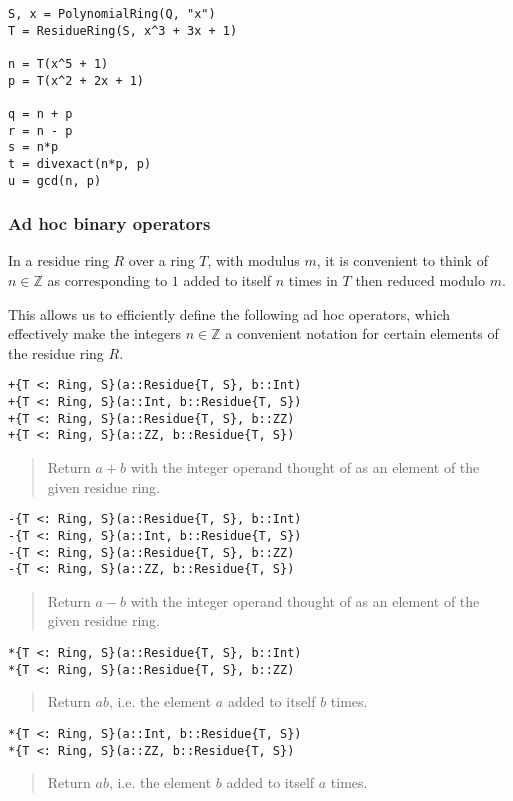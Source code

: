 \documentclass[a4paper,10pt]{article}
\newcommand{\Z}{\mathbb{Z}}
\newcommand{\desc}[1]{\vspace{-3mm}\begin{quote}#1\end{quote}}
\begin{document}
{{\begin{lstlisting}
S, x = PolynomialRing(Q, "x")
T = ResidueRing(S, x^3 + 3x + 1)

n = T(x^5 + 1)
p = T(x^2 + 2x + 1)

q = n + p
r = n - p
s = n*p
t = divexact(n*p, p)
u = gcd(n, p)
\end{lstlisting}

\subsubsection{Ad hoc binary operators}

In a residue ring $R$ over a ring $T$, with modulus $m$, it is convenient
to think of $n \in \Z$ as corresponding to $1$ added to itself $n$ times
in $T$ then reduced modulo $m$.

This allows us to efficiently define the following ad hoc operators, which
effectively make the integers $n \in \Z$ a convenient notation for certain
elements of the residue ring $R$.

\begin{lstlisting}
+{T <: Ring, S}(a::Residue{T, S}, b::Int)
+{T <: Ring, S}(a::Int, b::Residue{T, S})
+{T <: Ring, S}(a::Residue{T, S}, b::ZZ)
+{T <: Ring, S}(a::ZZ, b::Residue{T, S})
\end{lstlisting}

\desc{Return $a + b$ with the integer operand thought of as an element of 
the given residue ring.}

\begin{lstlisting}
-{T <: Ring, S}(a::Residue{T, S}, b::Int)
-{T <: Ring, S}(a::Int, b::Residue{T, S})
-{T <: Ring, S}(a::Residue{T, S}, b::ZZ)
-{T <: Ring, S}(a::ZZ, b::Residue{T, S})
\end{lstlisting}

\desc{Return $a - b$ with the integer operand thought of as an element of 
the given residue ring.}

\begin{lstlisting}
*{T <: Ring, S}(a::Residue{T, S}, b::Int)
*{T <: Ring, S}(a::Residue{T, S}, b::ZZ)
\end{lstlisting}

\desc{Return $ab$, i.e. the element $a$ added to itself $b$ times.}

\begin{lstlisting}
*{T <: Ring, S}(a::Int, b::Residue{T, S})
*{T <: Ring, S}(a::ZZ, b::Residue{T, S})
\end{lstlisting}

\desc{Return $ab$, i.e. the element $b$ added to itself $a$ times.}

}}
\end{document}
